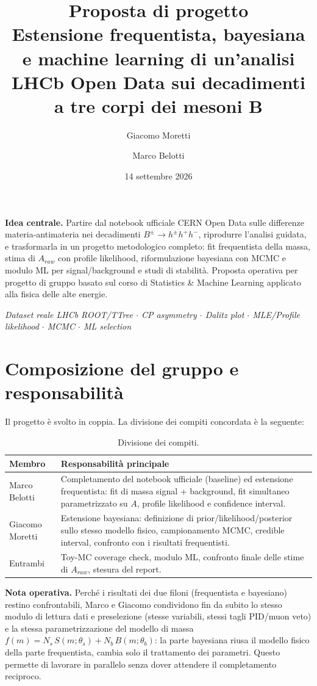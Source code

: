 \documentclass[11pt,a4paper]{article}
\title{\color{accent}\textbf{Proposta di progetto}\\[0.3em]
\Large Estensione frequentista, bayesiana e machine learning di un'analisi LHCb Open Data sui decadimenti a tre corpi dei mesoni B}
\author{Giacomo Moretti \and Marco Belotti}
\date{14 settembre 2026}
\begin{document}
\maketitle

\noindent\textbf{Idea centrale.} Partire dal notebook ufficiale CERN Open Data sulle differenze materia-antimateria nei decadimenti $B^{\pm} \to h^{\pm} h^{+} h^{-}$, riprodurre l'analisi guidata, e trasformarla in un progetto metodologico completo: fit frequentista della massa, stima di $A_{raw}$ con profile likelihood, riformulazione bayesiana con MCMC e modulo ML per signal/background e studi di stabilità. Proposta operativa per progetto di gruppo basato sul corso di Statistics \& Machine Learning applicato alla fisica delle alte energie.

\emph{Dataset reale LHCb ROOT/TTree $\cdot$ CP asymmetry $\cdot$ Dalitz plot $\cdot$ MLE/Profile likelihood $\cdot$ MCMC $\cdot$ ML selection}

\section{Composizione del gruppo e responsabilità}

Il progetto è svolto in coppia. La divisione dei compiti concordata è la seguente:

\begin{table}[h!]
\centering
\begin{tabular}{L{3.5cm} L{10cm}}
\toprule
\textbf{Membro} & \textbf{Responsabilità principale} \\
\midrule
Marco Belotti & Completamento del notebook ufficiale (baseline) ed estensione frequentista: fit di massa signal + background, fit simultaneo parametrizzato su $A$, profile likelihood e confidence interval. \\
\addlinespace
Giacomo Moretti & Estensione bayesiana: definizione di prior/likelihood/posterior sullo stesso modello fisico, campionamento MCMC, credible interval, confronto con i risultati frequentisti. \\
\addlinespace
Entrambi & Toy-MC coverage check, modulo ML, confronto finale delle stime di $A_{raw}$, stesura del report. \\
\bottomrule
\end{tabular}
\caption{Divisione dei compiti.}
\end{table}

\noindent\textbf{Nota operativa.} Perché i risultati dei due filoni (frequentista e bayesiano) restino confrontabili, Marco e Giacomo condividono fin da subito lo stesso modulo di lettura dati e preselezione (stesse variabili, stessi tagli PID/muon veto) e la stessa parametrizzazione del modello di massa $f(m) = N_s\,S(m;\theta_s) + N_b\,B(m;\theta_b)$: la parte bayesiana riusa il modello fisico della parte frequentista, cambia solo il trattamento dei parametri. Questo permette di lavorare in parallelo senza dover attendere il completamento reciproco.
\end{document}
